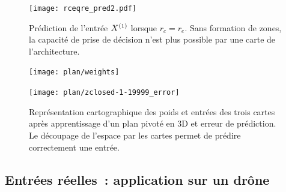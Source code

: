 \documentclass[../main]{subfiles}
\begin{document}
\begin{figure}
	\texttt{[image: rceqre\_pred2.pdf]}
	\caption{Prédiction de l'entrée $X^{({1})}$ lorsque $r_c = r_e$. Sans formation de zones, la capacité de prise de décision n'est plus possible par une carte de l'architecture. \label{fig:rcre_pred}}
\end{figure}



\begin{figure}
	\begin{minipage}{0.48\textwidth}
	\centering\texttt{[image: plan/weights]}
	\end{minipage}
	\begin{minipage}{0.48\textwidth}
	\texttt{[image: plan/zclosed-1-19999\_error]}	
	\end{minipage}	
	\caption{Représentation cartographique des poids et entrées des trois cartes après apprentissage d'un plan pivoté en 3D et erreur de prédiction. Le découpage de l'espace par les cartes permet de prédire correctement une entrée. \label{fig:plan3}}
	\end{figure}


\subsection{Entrées réelles~: application sur un drône}
\end{document}
